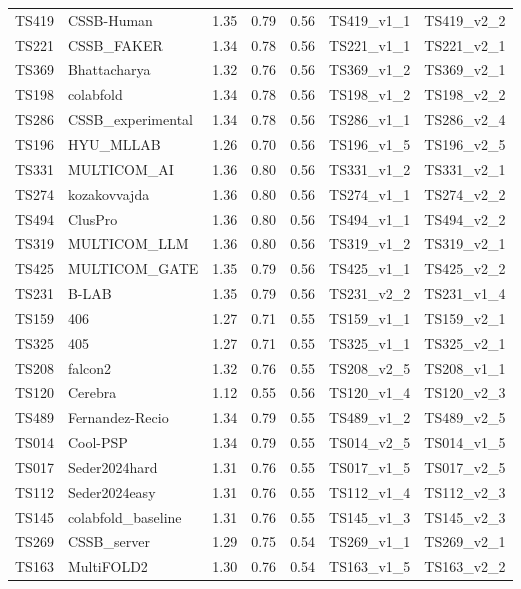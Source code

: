 \begin{longtable}{lllllll}
TS419 & CSSB-Human & 1.35 & 0.79 & 0.56 & TS419\_v1\_1 & TS419\_v2\_2 \\ 
TS221 & CSSB\_FAKER & 1.34 & 0.78 & 0.56 & TS221\_v1\_1 & TS221\_v2\_1 \\ 
TS369 & Bhattacharya & 1.32 & 0.76 & 0.56 & TS369\_v1\_2 & TS369\_v2\_1 \\ 
TS198 & colabfold & 1.34 & 0.78 & 0.56 & TS198\_v1\_2 & TS198\_v2\_2 \\ 
TS286 & CSSB\_experimental & 1.34 & 0.78 & 0.56 & TS286\_v1\_1 & TS286\_v2\_4 \\ 
TS196 & HYU\_MLLAB & 1.26 & 0.70 & 0.56 & TS196\_v1\_5 & TS196\_v2\_5 \\ 
TS331 & MULTICOM\_AI & 1.36 & 0.80 & 0.56 & TS331\_v1\_2 & TS331\_v2\_1 \\ 
TS274 & kozakovvajda & 1.36 & 0.80 & 0.56 & TS274\_v1\_1 & TS274\_v2\_2 \\ 
TS494 & ClusPro & 1.36 & 0.80 & 0.56 & TS494\_v1\_1 & TS494\_v2\_2 \\ 
TS319 & MULTICOM\_LLM & 1.36 & 0.80 & 0.56 & TS319\_v1\_2 & TS319\_v2\_1 \\ 
TS425 & MULTICOM\_GATE & 1.35 & 0.79 & 0.56 & TS425\_v1\_1 & TS425\_v2\_2 \\ 
TS231 & B-LAB & 1.35 & 0.79 & 0.56 & TS231\_v2\_2 & TS231\_v1\_4 \\ 
TS159 & 406 & 1.27 & 0.71 & 0.55 & TS159\_v1\_1 & TS159\_v2\_1 \\ 
TS325 & 405 & 1.27 & 0.71 & 0.55 & TS325\_v1\_1 & TS325\_v2\_1 \\ 
TS208 & falcon2 & 1.32 & 0.76 & 0.55 & TS208\_v2\_5 & TS208\_v1\_1 \\ 
TS120 & Cerebra & 1.12 & 0.55 & 0.56 & TS120\_v1\_4 & TS120\_v2\_3 \\ 
TS489 & Fernandez-Recio & 1.34 & 0.79 & 0.55 & TS489\_v1\_2 & TS489\_v2\_5 \\ 
TS014 & Cool-PSP & 1.34 & 0.79 & 0.55 & TS014\_v2\_5 & TS014\_v1\_5 \\ 
TS017 & Seder2024hard & 1.31 & 0.76 & 0.55 & TS017\_v1\_5 & TS017\_v2\_5 \\ 
TS112 & Seder2024easy & 1.31 & 0.76 & 0.55 & TS112\_v1\_4 & TS112\_v2\_3 \\ 
TS145 & colabfold\_baseline & 1.31 & 0.76 & 0.55 & TS145\_v1\_3 & TS145\_v2\_3 \\ 
TS269 & CSSB\_server & 1.29 & 0.75 & 0.54 & TS269\_v1\_1 & TS269\_v2\_1 \\ 
TS163 & MultiFOLD2 & 1.30 & 0.76 & 0.54 & TS163\_v1\_5 & TS163\_v2\_2 \\ 

\end{longtable}
